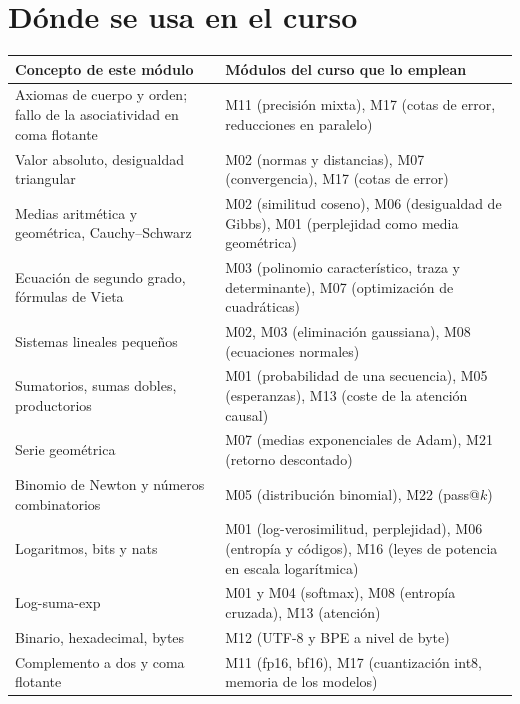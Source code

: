 \documentclass[11pt,a4paper,twoside,openany]{book}
\begin{document}
\section*{Dónde se usa en el curso}
\begin{center}\small
\begin{tabularx}{\textwidth}{@{}>{\raggedright\arraybackslash}p{5.2cm}>{\raggedright\arraybackslash}X@{}}
\toprule
Concepto de este módulo & Módulos del curso que lo emplean \\
\midrule
Axiomas de cuerpo y orden; fallo de la asociatividad en coma flotante & M11 (precisión mixta), M17 (cotas de error, reducciones en paralelo) \\
Valor absoluto, desigualdad triangular & M02 (normas y distancias), M07 (convergencia), M17 (cotas de error) \\
Medias aritmética y geométrica, Cauchy--Schwarz & M02 (similitud coseno), M06 (desigualdad de Gibbs), M01 (perplejidad como media geométrica) \\
Ecuación de segundo grado, fórmulas de Vieta & M03 (polinomio característico, traza y determinante), M07 (optimización de cuadráticas) \\
Sistemas lineales pequeños & M02, M03 (eliminación gaussiana), M08 (ecuaciones normales) \\
Sumatorios, sumas dobles, productorios & M01 (probabilidad de una secuencia), M05 (esperanzas), M13 (coste de la atención causal) \\
Serie geométrica & M07 (medias exponenciales de Adam), M21 (retorno descontado) \\
Binomio de Newton y números combinatorios & M05 (distribución binomial), M22 (pass@$k$) \\
Logaritmos, bits y nats & M01 (log-verosimilitud, perplejidad), M06 (entropía y códigos), M16 (leyes de potencia en escala logarítmica) \\
Log-suma-exp & M01 y M04 (softmax), M08 (entropía cruzada), M13 (atención) \\
Binario, hexadecimal, bytes & M12 (UTF-8 y BPE a nivel de byte) \\
Complemento a dos y coma flotante & M11 (fp16, bf16), M17 (cuantización int8, memoria de los modelos) \\
\bottomrule
\end{tabularx}
\end{center}
\end{document}
